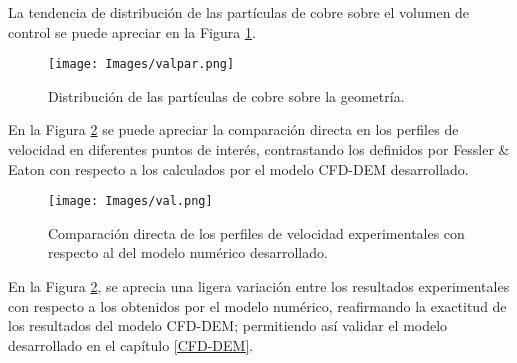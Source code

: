 \noindent
\justify

La tendencia de distribuci\'on de las part\'iculas de cobre sobre el volumen de control se puede apreciar en la Figura \ref{valten}.

\begin{figure}[h!]
	\centering
	\texttt{[image: Images/valpar.png]}
	\caption{Distribuci\'on de las part\'iculas de cobre sobre la geometr\'ia.}
	\label{valten}
\end{figure}

\noindent
\justify

En la Figura \ref{valcompa} se puede apreciar la comparaci\'on directa en los perfiles de velocidad en diferentes puntos de inter\'es, contrastando los definidos por Fessler \& Eaton con respecto a los calculados por el modelo CFD-DEM desarrollado.

\begin{figure}[h!]
	\centering
	\texttt{[image: Images/val.png]}
	\caption{Comparaci\'on directa de los perfiles de velocidad experimentales con respecto al del modelo num\'erico desarrollado.}
	\label{valcompa}
\end{figure}

\noindent
\justify

En la Figura \ref{valcompa}, se aprecia una ligera variaci\'on entre los resultados experimentales con respecto a los obtenidos por el modelo num\'erico, reafirmando la exactitud de los resultados del modelo CFD-DEM; permitiendo as\'i validar el modelo desarrollado en el cap\'itulo \ref{CFD-DEM}.
